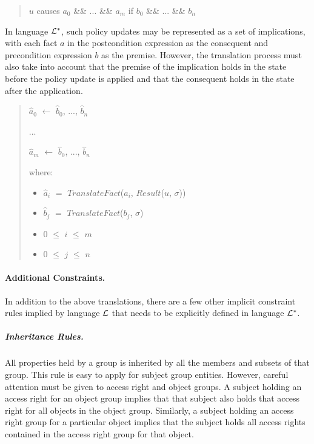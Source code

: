 \documentclass[10pt, twocolumn]{article}
\begin{document}
          \begin{quote}
            $u$ causes $a_{0}$ \&\& ... \&\& $a_{m}$
            if $b_{0}$ \&\& ... \&\& $b_{n}$
          \end{quote}

          In language ${\cal L}^{*}$, such policy updates may be represented as
          a set of implications, with each fact $a$ in the postcondition
          expression as the consequent and precondition expression $b$ as the
          premise. However, the translation process must also take into account
          that the premise of the implication holds in the state before the
          policy update is applied and that the consequent holds in the state
          after the application.

          \begin{quote}
            $\hat{a}_{0}$ $\leftarrow$ $\hat{b}_{0}$, ..., $\hat{b}_{n}$

            ...

            $\hat{a}_{m}$ $\leftarrow$ $\hat{b}_{0}$, ..., $\hat{b}_{n}$

            where:

            \begin{itemize}
              \item
                $\hat{a}_{i}$ $=$ $TranslateFact$($a_{i}$, $Result$($u$, $\sigma$))
              \item
                $\hat{b}_{j}$ $=$ $TranslateFact$($b_{j}$, $\sigma$)
              \item
                $0$ $\leq$ $i$ $\leq$ $m$
              \item
                $0$ $\leq$ $j$ $\leq$ $n$

            \end{itemize}
          \end{quote}

        \paragraph{Additional Constraints.}

          In addition to the above translations, there are a few other implicit
          constraint rules implied by language ${\cal L}$ that needs to be
          explicitly defined in language ${\cal L}^{*}$.

          \subparagraph{Inheritance Rules.}

            All properties held by a group is inherited by all the members and
            subsets of that group. This rule is easy to apply for subject group
            entities. However, careful attention must be given to access right
            and object groups. A subject holding an access right for an object
            group implies that that subject also holds that access right for
            all objects in the object group. Similarly, a subject holding an
            access right group for a particular object implies that the subject
            holds all access rights contained in the access right group for
            that object.
\end{document}

